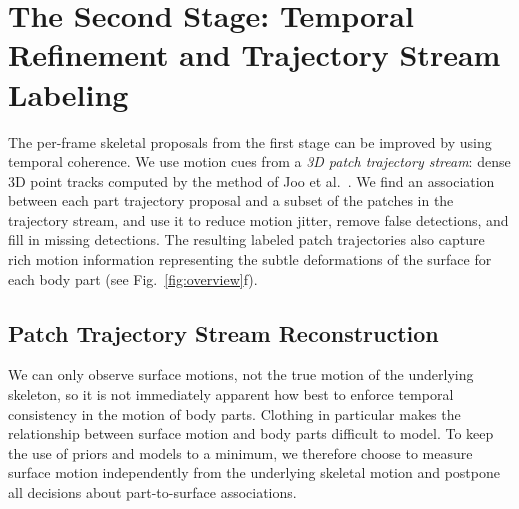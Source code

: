 \section{The Second Stage: Temporal Refinement and Trajectory Stream Labeling}
The per-frame skeletal proposals from the first stage can be improved by using temporal coherence. We use motion cues from a {\em 3D patch trajectory stream}: dense 3D point tracks computed by the method of Joo et al.~\cite{Joo2014}. We find an association between each part trajectory proposal and a subset of the patches in the trajectory stream, and use it to reduce motion jitter, remove false detections, and fill in missing detections. The resulting labeled patch trajectories also capture rich motion information representing the subtle deformations of the surface for each body part (see Fig.~\ref{fig:overview}f).

%	

\subsection{Patch Trajectory Stream Reconstruction}
\label{subsection:patchTrajectoryRecon}
We can only observe surface motions, not the true motion of the underlying skeleton, so it is not immediately apparent how best to enforce temporal consistency in the motion of body parts. Clothing in particular makes the relationship between surface motion and body parts difficult to model. To keep the use of priors and models to a minimum, we therefore choose to measure surface motion independently from the underlying skeletal motion and postpone all decisions about part-to-surface associations.

